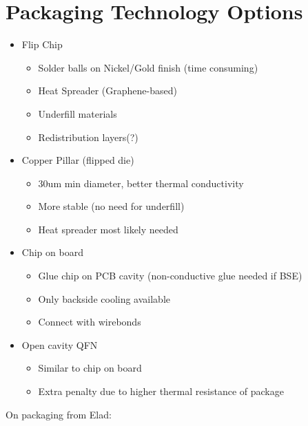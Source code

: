 \documentclass{article}
\begin{document}
\newpage


\section{Packaging Technology Options}

\begin{itemize}
	\item Flip Chip
	\begin{itemize}
		\item Solder balls on Nickel/Gold finish (time consuming) %
		\item Heat Spreader (Graphene-based)
		\item Underfill materials
		\item Redistribution layers(?)
	\end{itemize}
	\item Copper Pillar (flipped die)
	\begin{itemize}
		\item 30um min diameter, better thermal conductivity
		\item More stable (no need for underfill)
		\item Heat spreader most likely needed
	\end{itemize}
	\item Chip on board
	\begin{itemize}
		\item Glue chip on PCB cavity (non-conductive glue needed if BSE)
		\item Only backside cooling available
		\item Connect with wirebonds
	\end{itemize}
	\item Open cavity QFN
	\begin{itemize}
		\item Similar to chip on board
		\item Extra penalty due to higher thermal resistance of package
	\end{itemize}
\end{itemize}

On packaging from Elad:
\end{document}
